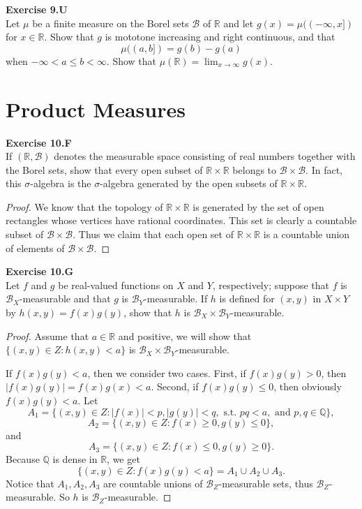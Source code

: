 \documentclass[12pt, a4paper]{article}
\theoremstyle{plain}
\newcommand{\B}{\mathscr{B}}
\newcommand{\Q}{\mathbb{Q}}
\newcommand{\R}{\mathbb{R}}
\newenvironment{exercise}[2][Exercise]
    { \begin{mdframed}[backgroundcolor=gray!20] \textbf{#1 #2} \\}
    {  \end{mdframed}}
\begin{document}
\begin{exercise}{9.U}
    Let $\mu$ be a finite measure on the Borel sets $\B$ of $\R$ and let $g(x)=\mu((-\infty,x])$ for $x\in\R$. Show that $g$ is mototone increasing and right continuous, and that 
    \[
    \mu((a,b])=g(b)-g(a)
    \]
    when $-\infty<a\leq b<\infty$. Show that $\mu(\R)=\lim_{x\to\infty}g(x)$.
\end{exercise}

\pagebreak

\section{Product Measures}

\begin{exercise}{10.F}
    If $(\R,\B)$ denotes the measurable space consisting of real numbers together with the Borel sets, show that every open subset of $\R\times\R$ belongs to $\B\times \B$. In fact, this $\sigma$-algebra is the $\sigma$-algebra generated by the open subsets of $\R\times\R$.
\end{exercise}
    \begin{proof}
        We know that the topology of $\R\times \R$ is generated by the set of open rectangles whose vertices have rational coordinates. This set is clearly a countable subset of $\B\times \B$. Thus we claim that each open set of $\R\times\R$ is a countable union of elements of $\B\times\B$.
    \end{proof}

\begin{exercise}{10.G}
    Let $f$ and $g$ be real-valued functions on $X$ and $Y$, respectively; suppose that $f$ is $\B_X$-measurable and that $g$ is $\B_Y$-measurable. If $h$ is defined for $(x,y)$ in $X\times Y$ by $h(x,y)=f(x)g(y)$, show that $h$ is $\B_X\times\B_Y$-measurable.
\end{exercise}
    \begin{proof}
        Assume that $a\in \R$ and positive, we will show that $\{(x,y)\in Z:h(x,y)<a\}$ is $\B_X\times\B_Y$-measurable.
        
        If $f(x)g(y)<a$, then we consider two cases. First, if $f(x)g(y)>0$, then $|f(x)g(y)|=f(x)g(x)<a$. Second, if $f(x)g(y)\leq 0$, then obviously $f(x)g(y)<a$. Let
        \[
        A_1=\{(x,y)\in Z:|f(x)|<p,|g(y)|<q, \text{ s.t. }pq<a,\text{ and } p,q\in \Q\},
        \]
        \[
        A_2=\{(x,y)\in Z: f(x)\geq 0,g(y)\leq 0\},
        \]
        and
        \[
        A_3=\{(x,y)\in Z: f(x)\leq 0, g(y)\geq 0\}.
        \]
        Because $\Q$ is dense in $\R$, we get
        \[
        \{(x,y)\in Z:f(x)g(y)<a\} = A_1\cup A_2\cup A_3.
        \]
        Notice that $A_1,A_2,A_3$ are countable unions of $\B_Z$-measurable sets, thus $\B_Z$-measurable. So $h$ is $\B_Z$-measurable.
    \end{proof}
\end{document}
